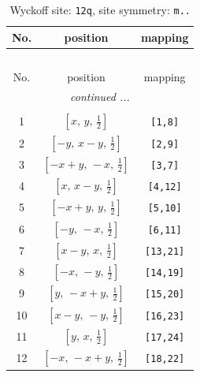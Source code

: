 \documentclass[fleqn,8pt]{jsarticle}
\begin{document}
\begin{longtable}{ccc}
\caption{Wyckoff site: {\tt 12q}, site symmetry: {\tt m..}}
 \\
 \hline \hline
No. & position & mapping \\ \hline \endfirsthead

\multicolumn{2}{l}{\tablename\ \thetable{}} \\
 \hline \hline
No. & position & mapping \\ \hline \endhead

 \hline \hline
\multicolumn{2}{r}{\footnotesize\it continued ...} \\ \endfoot

 \hline \hline
\multicolumn{2}{r}{} \\ \endlastfoot

1 & $\left[ x,\, y,\, \frac{1}{2} \right]$ & {\tt [1,8]} \\ \hline
2 & $\left[ - y,\, x - y,\, \frac{1}{2} \right]$ & {\tt [2,9]} \\ \hline
3 & $\left[ - x + y,\, - x,\, \frac{1}{2} \right]$ & {\tt [3,7]} \\ \hline
4 & $\left[ x,\, x - y,\, \frac{1}{2} \right]$ & {\tt [4,12]} \\ \hline
5 & $\left[ - x + y,\, y,\, \frac{1}{2} \right]$ & {\tt [5,10]} \\ \hline
6 & $\left[ - y,\, - x,\, \frac{1}{2} \right]$ & {\tt [6,11]} \\ \hline
7 & $\left[ x - y,\, x,\, \frac{1}{2} \right]$ & {\tt [13,21]} \\ \hline
8 & $\left[ - x,\, - y,\, \frac{1}{2} \right]$ & {\tt [14,19]} \\ \hline
9 & $\left[ y,\, - x + y,\, \frac{1}{2} \right]$ & {\tt [15,20]} \\ \hline
10 & $\left[ x - y,\, - y,\, \frac{1}{2} \right]$ & {\tt [16,23]} \\ \hline
11 & $\left[ y,\, x,\, \frac{1}{2} \right]$ & {\tt [17,24]} \\ \hline
12 & $\left[ - x,\, - x + y,\, \frac{1}{2} \right]$ & {\tt [18,22]} \\
\end{longtable}
\renewcommand{\arraystretch}{1.2}
\end{document}
